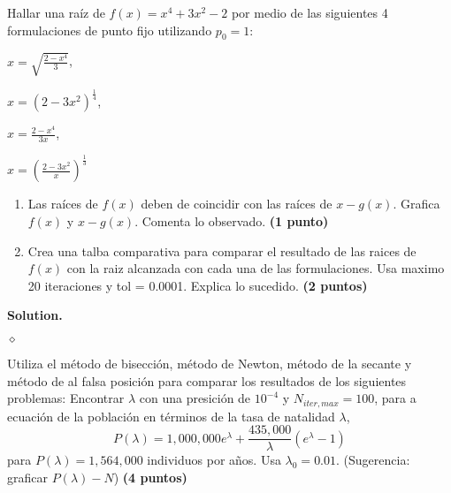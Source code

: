 \documentclass{article}
\theoremstyle{problemstyle}
\newenvironment{solution}{%
  \begin{mdframed}[linewidth=0.8pt,linecolor=Gray,backgroundcolor=Gray!5,roundcorner=5pt, nobreak=true]%
  \noindent\textbf{Solution.}%
}{%
\hfill $ \diamond $ 
  \end{mdframed}%
}
\begin{document}
\begin{problem}
  Hallar una ra\'iz de $ f(x) = x^4 + 3x^2 - 2 $ por medio de las siguientes 4 formulaciones de punto fijo utilizando $ p_0 = 1 $:
\begin{center}
  \begin{enumerate*}[label=\alph*),itemjoin=\qquad]
    
    \item $\displaystyle x = \sqrt{\frac{2-x^4}{3}} $,
    \item $\displaystyle x = (2-3x^2)^{\frac{1}{4}}$,
    \item $\displaystyle x = \frac{2-x^4}{3x} $,
    \item $\displaystyle x = \left(\frac{2-3x^2}{x}\right)^{\frac{1}{3}}$ 
  \end{enumerate*}
\end{center}

  \begin{enumerate}
    \item Las ra\'ices de $ f(x) $ deben de coincidir con las ra\'ices de $ x-g(x) $. Grafica $ f(x) $ y $ x-g(x) $. Comenta lo observado. \textbf{(1 punto)}
      
    \item Crea una talba comparativa para comparar el resultado de las raices de $f(x) $ con la raiz alcanzada con cada una de las formulaciones. Usa maximo 20 iteraciones y tol = 0.0001. Explica lo sucedido. \textbf{(2 puntos)}
  \end{enumerate}
\end{problem}
\begin{solution}
  
\end{solution}

\begin{problem}
  Utiliza el m\'etodo de bisecci\'on, m\'etodo de Newton, m\'etodo de la secante y m\'etodo de al falsa posici\'on para comparar los resultados de los siguientes problemas:
  Encontrar $ \lambda $ con una presici\'on de $ 10^{-4} $ y $ N_{iter, max} = 100 $, para a ecuaci\'on de la poblaci\'on en t\'erminos de la tasa de natalidad $ \lambda $,
  \[
    P(\lambda) = 1,000,000 e^{\lambda} + \frac{435,000}{\lambda}(e^{\lambda} - 1)
  \]
  para $ P(\lambda) = 1,564,000 $ individuos por a\~nos. Usa $ \lambda_0 = 0.01 $. (Sugerencia: graficar $ P(\lambda) - N $) \textbf{(4 puntos)}
\end{problem}




\end{document}

